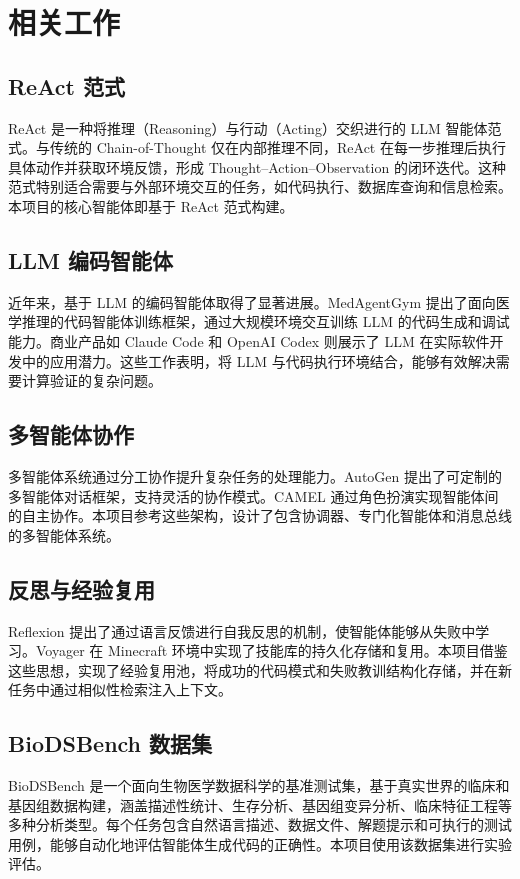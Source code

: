 \section{相关工作}

\subsection{ReAct 范式}

ReAct\cite{yao2023react} 是一种将推理（Reasoning）与行动（Acting）交织进行的 LLM 智能体范式。与传统的 Chain-of-Thought 仅在内部推理不同，ReAct 在每一步推理后执行具体动作并获取环境反馈，形成 Thought--Action--Observation 的闭环迭代。这种范式特别适合需要与外部环境交互的任务，如代码执行、数据库查询和信息检索。本项目的核心智能体即基于 ReAct 范式构建。

\subsection{LLM 编码智能体}

近年来，基于 LLM 的编码智能体取得了显著进展。MedAgentGym\cite{xu2025medagentgym} 提出了面向医学推理的代码智能体训练框架，通过大规模环境交互训练 LLM 的代码生成和调试能力。商业产品如 Claude Code 和 OpenAI Codex 则展示了 LLM 在实际软件开发中的应用潜力。这些工作表明，将 LLM 与代码执行环境结合，能够有效解决需要计算验证的复杂问题。

\subsection{多智能体协作}

多智能体系统通过分工协作提升复杂任务的处理能力。AutoGen\cite{wu2023autogen} 提出了可定制的多智能体对话框架，支持灵活的协作模式。CAMEL\cite{li2023camel} 通过角色扮演实现智能体间的自主协作。本项目参考这些架构，设计了包含协调器、专门化智能体和消息总线的多智能体系统。

\subsection{反思与经验复用}

Reflexion\cite{shinn2023reflexion} 提出了通过语言反馈进行自我反思的机制，使智能体能够从失败中学习。Voyager\cite{wang2023voyager} 在 Minecraft 环境中实现了技能库的持久化存储和复用。本项目借鉴这些思想，实现了经验复用池，将成功的代码模式和失败教训结构化存储，并在新任务中通过相似性检索注入上下文。

\subsection{BioDSBench 数据集}

BioDSBench\cite{wang2024biodsbench} 是一个面向生物医学数据科学的基准测试集，基于真实世界的临床和基因组数据构建，涵盖描述性统计、生存分析、基因组变异分析、临床特征工程等多种分析类型。每个任务包含自然语言描述、数据文件、解题提示和可执行的测试用例，能够自动化地评估智能体生成代码的正确性。本项目使用该数据集进行实验评估。
